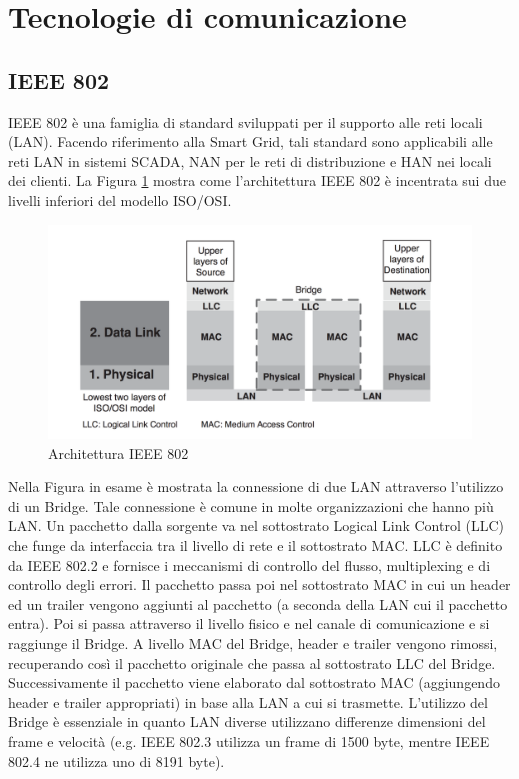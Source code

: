 \section{Tecnologie di comunicazione}
\subsection{IEEE 802}
IEEE 802 è una famiglia di standard sviluppati per il supporto alle reti locali (LAN). Facendo riferimento alla Smart Grid, tali standard sono applicabili alle reti LAN in sistemi SCADA, NAN per le reti di distribuzione e HAN nei locali dei clienti. La Figura \ref{fig:arch_802} mostra come l'architettura IEEE 802 è incentrata sui due livelli inferiori del modello ISO/OSI.
\begin{figure}[h]
	\centering
	\includegraphics[scale=0.330]{imgs/arch_ieee802.png}
	\caption{Architettura IEEE 802} \label{fig:arch_802}
\end{figure}
Nella Figura in esame è mostrata la connessione di due LAN attraverso l'utilizzo di un Bridge. Tale connessione è comune in molte organizzazioni che hanno più LAN. Un pacchetto dalla sorgente va nel sottostrato Logical Link Control (LLC) che funge da interfaccia tra il livello di rete e il sottostrato MAC. LLC è definito da IEEE 802.2 e fornisce i meccanismi di controllo del flusso, multiplexing e di controllo degli errori. Il pacchetto passa poi nel sottostrato MAC in cui un header ed un trailer vengono aggiunti al pacchetto (a seconda della LAN cui il pacchetto entra). Poi si passa attraverso il livello fisico e nel canale di comunicazione e si raggiunge il Bridge. A livello MAC del Bridge, header e trailer vengono rimossi, recuperando così il pacchetto originale che passa al sottostrato LLC del Bridge. Successivamente il pacchetto viene elaborato dal sottostrato MAC (aggiungendo header e trailer appropriati) in base alla LAN a cui si trasmette. L'utilizzo del Bridge è essenziale in quanto LAN diverse utilizzano differenze dimensioni del frame e velocità (e.g. IEEE 802.3 utilizza un frame di 1500 byte, mentre IEEE 802.4 ne utilizza uno di 8191 byte\cite{802.3}).

